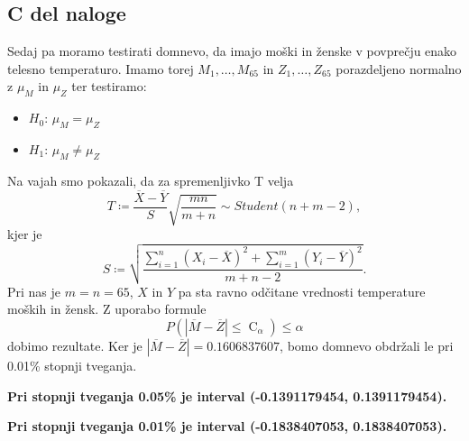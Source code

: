 \documentclass{article}
\DeclareMathOperator{\CM}{C}
\begin{document}
    \subsection{C del naloge}
    Sedaj pa moramo testirati domnevo, da imajo moški in ženske v povprečju enako telesno temperaturo. Imamo torej $M_{1}, \ldots, M_{65}$ in $Z_{1}, \ldots, Z_{65}$ porazdeljeno
    normalno z $\mu_{M}$ in $\mu_{Z}$ ter testiramo:
    \begin{itemize}
        \item $H_{0}$: $\mu_{M} = \mu_{Z}$
        \item $H_{1}$: $\mu_{M} \neq \mu_{Z}$
    \end{itemize}
    Na vajah smo pokazali, da za spremenljivko T velja
    \[
        T \coloneqq \frac{\overline{X} - \overline{Y}}{S}\sqrt{\frac{mn}{m + n}} \sim Student(n + m - 2),
    \]
    kjer je
    \[
        S \coloneqq \sqrt{\frac{\sum_{i = 1}^n (X_{i} - \overline{X})^2 + \sum_{i = 1}^m (Y_{i} - \overline{Y})^2}{m + n - 2}}.
    \]
    Pri nas je $m = n = 65$, $X$ in $Y$ pa sta ravno odčitane vrednosti temperature moških in žensk. Z uporabo formule
    \[
        P(|\overline{M} - \overline{Z}| \leq \CM_{\alpha}) \leq \alpha 
    \]
    dobimo rezultate. Ker je $|\overline{M} - \overline{Z}| = 0.1606837607$, bomo domnevo obdržali le pri 0.01\% stopnji tveganja.
    \par \textbf{Pri stopnji tveganja 0.05\% je interval (-0.1391179454, 0.1391179454).}
    \par \textbf{Pri stopnji tveganja 0.01\% je interval (-0.1838407053, 0.1838407053).}
\end{document}
